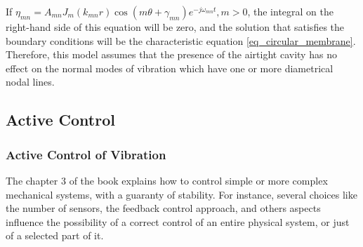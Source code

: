 \documentclass[11pt, twocolumn]{article}
\begin{document}
If $\eta_{mn}=A_{mn}J_m(k_{mn}r)\cos(m\theta + \gamma_{mn})e^{-j\omega_{mn} t}, m > 0$, the integral on the right-hand side of this equation will be zero, and the solution that satisfies the boundary conditions will be the characteristic equation \eqref{eq_circular_membrane}. Therefore, this model assumes that the presence of the airtight cavity has no effect on the normal modes of vibration which have one or more diametrical nodal lines. 









\subsection{Active Control}\label{sec:activecontrol}
\subsubsection{Active Control of Vibration}

The chapter 3 of the book \cite{fuller1996active} explains how to control simple or more complex mechanical systems,  with a guaranty of stability.  For instance, several choices like the number of sensors, the feedback control approach, and others aspects influence the possibility of a correct control of an entire physical system, or just of a selected part of it.\\
\end{document}
